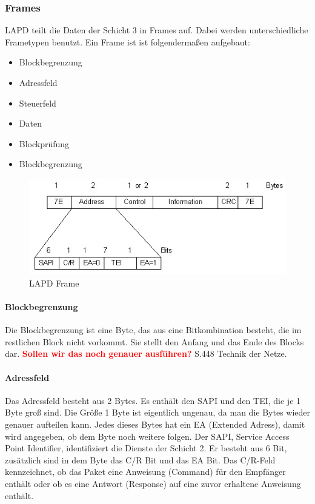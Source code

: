 \documentclass[12pt, a4paper, ngerman]{article}
\begin{document}
\subsubsection{Frames}
LAPD teilt die Daten der Schicht 3 in Frames auf. Dabei werden unterschiedliche Frametypen benutzt. Ein Frame ist ist folgendermaßen aufgebaut:

\begin{itemize}
	\item Blockbegrenzung
	\item Adressfeld
	\item Steuerfeld
	\item Daten
	\item Blockprüfung
	\item Blockbegrenzung
\end{itemize}

\begin{figure}[H]
	\centering
	\includegraphics[width=0.9\linewidth]{Grafiken/lapd_frame.jpg}
	\caption{LAPD Frame \cite{lapd_rahmen}}
	\label{lapd_frame}
\end{figure}

\paragraph{Blockbegrenzung}
Die Blockbegrenzung ist eine Byte, das aus eine Bitkombination besteht, die im restlichen Block nicht vorkommt. Sie stellt den Anfang und das Ende des Blocks dar. \textcolor{red}{\textbf{Sollen wir das noch genauer ausführen?}}  S.448 Technik der Netze.  

\paragraph{Adressfeld}
Das Adressfeld besteht aus 2 Bytes. Es enthält den SAPI und den TEI, die je 1 Byte groß sind. Die Größe 1 Byte ist eigentlich ungenau, da man die Bytes wieder genauer aufteilen kann. Jedes dieses Bytes hat ein EA (Extended Adress), damit wird angegeben, ob dem Byte noch weitere folgen. Der SAPI, Service Access Point Identifier,  identifiziert die Dienste der Schicht 2. Er besteht aus 6 Bit, zusätzlich sind in dem Byte das C/R Bit und das EA Bit. Das C/R-Feld kennzeichnet, ob das Paket eine Anweisung (Command) für den Empfänger enthält oder ob es eine Antwort (Response) auf eine zuvor erhaltene Anweisung enthält. 
\end{document}

